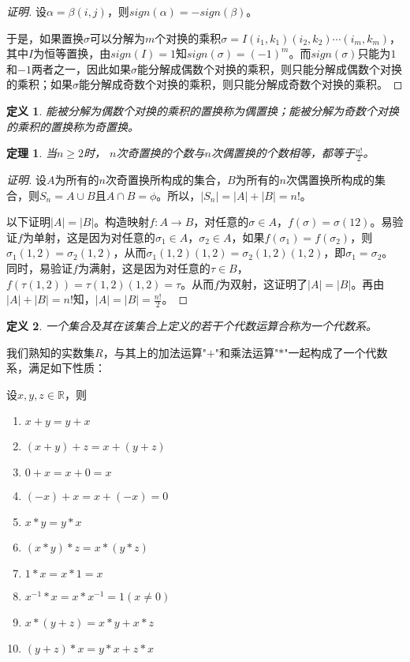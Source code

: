 \documentclass{book}[oneside]
\newtheorem{Def}{定义}[chapter]
\newtheorem{Thm}{定理}[chapter]
\begin{document}
\begin{CJK*}{UTF8}{gbsn}
\begin{proof}[证明]
设$\alpha = \beta (i,j)$，则$sign(\alpha) = -sign(\beta)$。

于是，如果置换$\sigma$可以分解为$m$个对换的乘积$\sigma = I(i_1,k_1)(i_2,k_2)\cdots (i_m,k_m)$，其中$I$为恒等置换，由$sign(I)=1$知$sign(\sigma) = (-1)^m$。而$sign(\sigma)$只能为$1$和$-1$两者之一，因此如果$\sigma$能分解成偶数个对换的乘积，则只能分解成偶数个对换的乘积；如果$\sigma$能分解成奇数个对换的乘积，则只能分解成奇数个对换的乘积。
  \end{proof}
  \begin{Def}
    能被分解为偶数个对换的乘积的置换称为偶置换；能被分解为奇数个对换的乘积的置换称为奇置换。
  \end{Def}
    \begin{Thm}
    当$n \geq 2$时， $n$次奇置换的个数与$n$次偶置换的个数相等，都等于$\frac{n!}{2}$。
  \end{Thm}
     \begin{proof}[证明]
     设$A$为所有的$n$次奇置换所构成的集合，$B$为所有的$n$次偶置换所构成的集合，则$S_n=A\cup B$且$A\cap B=\phi$。所以，$|S_n|=|A| + |B|=n!$。

     以下证明$|A|=|B|$。构造映射$f:A\to B$，对任意的$\sigma\in A$，$f(\sigma) = \sigma(12)$。易验证$f$为单射，这是因为对任意的$\sigma_1\in A$，$\sigma_2\in A$，如果$f(\sigma_1)=f(\sigma_2)$，则$\sigma_1(1,2)=\sigma_2(1,2)$，从而$\sigma_1(1,2)(1,2)=\sigma_2(1,2)(1,2)$，即$\sigma_1=\sigma_2$。同时，易验证$f$为满射，这是因为对任意的$\tau \in B$，$f(\tau(1,2))=\tau(1,2)(1,2)=\tau$。从而$f$为双射，这证明了$|A|=|B|$。再由$|A|+|B|=n!$知，$|A|=|B|=\frac{n!}{2}$。
   \end{proof}

      \begin{Def}
    一个集合及其在该集合上定义的若干个代数运算合称为一个代数系。
  \end{Def}
  我们熟知的实数集$R$，与其上的加法运算"$+$"和乘法运算"$*$"一起构成了一个代数系，满足如下性质：
  
    设$x, y, z \in \mathbb{R}$，则
   \begin{enumerate}
   \item   $x + y = y + x$
   \item   $(x + y) + z = x + (y + z)$
   \item   $0 + x = x + 0 = x$
   \item   $(-x) + x =x + (-x) = 0$
   \item   $x * y = y * x$
   \item   $(x * y) * z = x * (y *z)$
   \item   $1 * x = x * 1 = x$
   \item   $x^{-1} * x = x * x^{-1} = 1 (x \neq 0)$
   \item   $x* (y + z) = x * y + x * z$
   \item   $(y + z) * x = y * x + z * x$
    \end{enumerate}


\end{CJK*}
\end{document}
